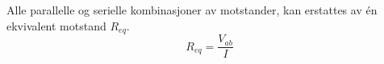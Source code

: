 Alle parallelle og serielle kombinasjoner av motstander,
kan erstattes av én ekvivalent motstand $R_{eq}$.
$$R_{eq} = \frac{V_{ab}}{I}$$
